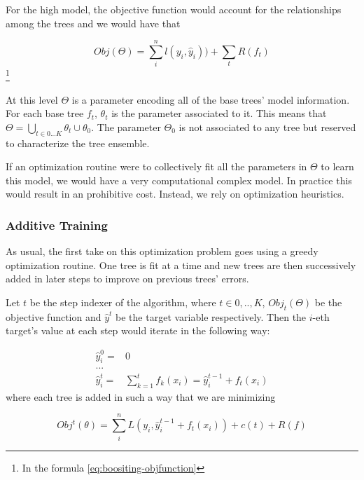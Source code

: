 For the high model, the objective function would account for the relationships among the trees and we would have that

\begin{equation} 
Obj(\Theta) = \sum_i^n l(y_i,\hat{y}_i)) + \sum_t R(f_t) 
\end{equation} \label{eq:boositing-objfunction} \footnote{In the formula \cref{eq:boositing-objfunction} }

At this level $\Theta$ is a parameter encoding all of the base trees' model information. For each base tree $f_t$, $\theta_t$ is the parameter associated to it. This means that $\Theta = \bigcup_{t \in {0...K}} \theta_t \cup \theta_0$. The parameter $\Theta_0$ is not associated to any tree but reserved to characterize the tree ensemble.

If an optimization routine were to collectively fit all the parameters in $\Theta$ to learn this model, we would have a very computational complex model. In practice this would result in an prohibitive cost. Instead, we rely on optimization heuristics.

\subsubsection{Additive Training}

As usual, the first take on this optimization problem goes using a greedy optimization routine. One tree is fit at a time and new trees are then successively added in later steps to improve on previous trees' errors.

Let $t$ be the step indexer of the algorithm, where $t \in {0,..,K}$, $Obj_t(\Theta)$ be the objective function and $\hat{y}^t$ be the target variable respectively. Then the $i$-eth target's value at each step would iterate in the following way:

\begin{equation} \label{eq:gb-targetSteps}
\begin{split}
\hat{y}_i^0 = & 0 \\
... \\
\hat{y}_i^t = &\sum_{k=1}^{t} f_k(x_i) = \hat{y}^{t-1}_i + f_t(x_i)
\end{split}
\end{equation}
where each tree is added in such a way that we are minimizing

\begin{equation}
Obj^t(\theta) = \sum_i^n L(y_i, \hat{y}^{t-1}_i + f_t(x_i) ) + c(t) + R(f)
\end{equation}


